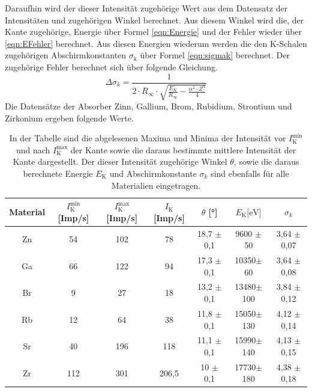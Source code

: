 \documentclass[titlepage = firstcover]{scrartcl}
\begin{document}
            \noindent
            Daraufhin wird der dieser Intensität zugehörige Wert aus dem Datensatz der Intensitäten und zugehörigen Winkel berechnet. Aus diesem Winkel wird die, der Kante zugehörige, Energie über 
            Formel \ref{eqn:Energie} und der Fehler wieder über \ref{eqn:EFehler} berechnet. Aus diesen Energien wiederum werden die den K-Schalen zugehörigen Abschirmkonstanten $\sigma_{\text{k}}$ 
            über Formel \ref{eqn:sigmak} berechnet. Der zugehörige Fehler berechnet sich über folgende Gleichung.
            \begin{equation*}
              \Delta \sigma_k = \frac{1}{2 \cdot R_{\infty}\cdot \sqrt{\frac{E_K}{R_{\infty}} - \frac{\alpha^2 \cdot Z^4}{4}}}
            \end{equation*}
            \noindent
            Die Datensätze der Absorber Zinn, Gallium, Brom, Rubidium, Strontium und Zirkonium ergeben folgende Werte. 
            \FloatBarrier
            \begin{table}[h]
              \centering
              \caption{In der Tabelle sind die abgelesenen Maxima und Minima der Intensität vor $I_{\text{K}}^{\text{min}}$ und nach $I_{\text{K}}^{\text{max}}$ der Kante sowie die daraus bestimmte mittlere Intensität der Kante dargestellt. Der dieser Intensität zugehörige Winkel $\theta$, sowie die daraus berechnete Energie $E_{\text{K}}$ und Abschirmkonstante $\sigma_k$ sind ebenfalls für alle Materialien eingetragen.}
              \label{tab:Absorption}
            
              \begin{tabular}{c c c c c c c}
                \toprule
                {Material}  & {$I_{\text{K}}^{\text{min}}$ [Imp/s]} & {$I_{\text{K}}^{\text{max}}$ [Imp/s]} & {$I_{\text{K}}$ [Imp/s]} & {$\theta$ [°]} & {$E_{\text{K}} \text{[eV]}$} & {$\sigma_k$} \\ 
                \midrule
                Zn	                &  54              & 102           &    78       &    18,7 $\pm$ 0,1  &   9600 $\pm$ 50   &   3,64 $\pm$ 0,07   \\
                Ga	                &  66              &  122          &    94       &   17,3  $\pm$ 0,1  &   10350$\pm$ 60   &   3,64 $\pm$ 0,08   \\
                Br	                &  9               &  27           &    18       &   13,2  $\pm$ 0,1  &   13480$\pm$ 100  &   3,84 $\pm$ 0,12   \\
                Rb	                &  12              &  64           &    38       &   11,8  $\pm$ 0,1  &   15050$\pm$ 130  &   4,12 $\pm$ 0,14   \\
                Sr	                &  40              &  196          &    118      &    11,1 $\pm$ 0,1  &   15990$\pm$ 140  &   4,13 $\pm$ 0,15   \\
                Zr	                &  112             &  301          &    206,5    &    10   $\pm$ 0,1  &   17730$\pm$ 180  &   4,38 $\pm$ 0,18   \\
                \bottomrule
              \end{tabular}
            \end{table}
\end{document}
